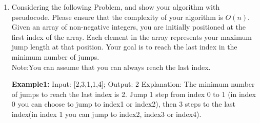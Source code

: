 \documentclass{article}
\begin{document}
\begin{enumerate}
\item Considering the following Problem, and show your algorithm with pseudocode. Please ensure that the complexity of your algorithm is $O(n)$.\\
Given an array of non-negative integers, you are initially positioned at the first index of the array. Each element in the array represents your maximum jump length at that position. Your goal is to reach the last index in the minimum number of jumps.\\

Note:You can assume that you can always reach the last index.

\textbf{Example1:} Input: [2,3,1,1,4]; Output: 2
Explanation: The minimum number of jumps to reach the last index is 2. Jump 1 step from index 0 to 1 (in index 0 you can choose to jump to index1 or index2), then 3 steps to the last index(in index 1 you can jump to index2, index3 or index4).

~\\


\end{enumerate}
\end{document}
